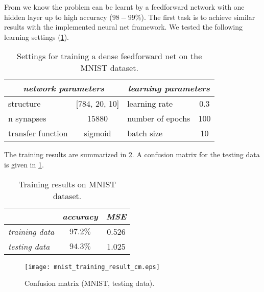 From \citep{online:mnist} we know the problem can be learnt by a feedforward network with one hidden layer up to high accuracy ($ 98-99\% $). The first task is to achieve similar results with the implemented neural net framework. We tested the following learning settings (\cref{tab:examples:mnist_training_settings}).

\begin{table}[H]
\centering
\begin{tabular}{|l|c|l|c|}
\hline
\multicolumn{2}{|c|}{\textit{network parameters}} & \multicolumn{2}{c|}{\textit{learning parameters}} \\ \hline
structure               & {[}784, 20, 10{]}       & learning rate                  & 0.3              \\ \hline
n synapses              & 15880                   & number of epochs               & 100              \\ \hline
transfer function       & sigmoid                 & batch size               & 10              \\ \hline
\end{tabular}
\caption{Settings for training a dense feedforward net on the MNIST dataset.}
\label{tab:examples:mnist_training_settings}
\end{table}

The training results are summarized in \cref{tab:examples:mnist_training_results}. A confusion matrix for the testing data is given in \cref{fig:examples:mnist_cm}.

\begin{table}[H]
\centering
\begin{tabular}{|l|c|c|}
\hline
                       & \multicolumn{1}{l|}{\textit{accuracy}} & \multicolumn{1}{l|}{\textit{MSE}} \\ \hline
\textit{training data} & $ 97.2\% $                                      & 0.526                                 \\ \hline
\textit{testing data}  & $ 94.3\% $                                      & 1.025                                 \\ \hline
\end{tabular}
\caption{Training results on MNIST dataset.}
\label{tab:examples:mnist_training_results}
\end{table}

\begin{figure}[H]
\centering
\texttt{[image: mnist\_training\_result\_cm.eps]}
\caption{Confusion matrix (MNIST, testing data).}
\label{fig:examples:mnist_cm}
\end{figure}

